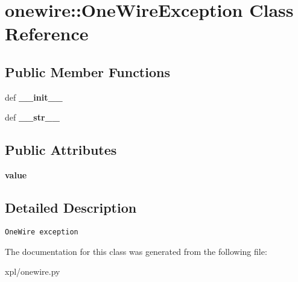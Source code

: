 \hypertarget{classonewire_1_1OneWireException}{
\section{onewire::OneWireException Class Reference}
\label{classonewire_1_1OneWireException}
}
\subsection*{Public Member Functions}
\begin{CompactItemize}
\item 
\hypertarget{classonewire_1_1OneWireException_e19dc9d7c1ad8e838679a1670ec20802}{
def \textbf{\_\-\_\-init\_\-\_\-}}
\label{classonewire_1_1OneWireException_e19dc9d7c1ad8e838679a1670ec20802}

\item 
\hypertarget{classonewire_1_1OneWireException_b97f5138487e792bca2b75f392cdd70d}{
def \textbf{\_\-\_\-str\_\-\_\-}}
\label{classonewire_1_1OneWireException_b97f5138487e792bca2b75f392cdd70d}

\end{CompactItemize}
\subsection*{Public Attributes}
\begin{CompactItemize}
\item 
\hypertarget{classonewire_1_1OneWireException_4e217e555112a6ddf7b601637a835571}{
\textbf{value}}
\label{classonewire_1_1OneWireException_4e217e555112a6ddf7b601637a835571}

\end{CompactItemize}


\subsection{Detailed Description}


\footnotesize\begin{verbatim}
OneWire exception
\end{verbatim}
\normalsize
 

The documentation for this class was generated from the following file:\begin{CompactItemize}
\item 
xpl/onewire.py\end{CompactItemize}
